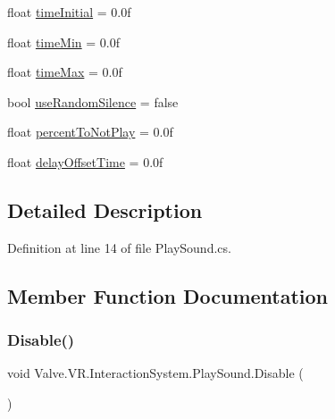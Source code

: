 \begin{DoxyCompactItemize}
\item 
float \mbox{\hyperlink{class_valve_1_1_v_r_1_1_interaction_system_1_1_play_sound_af2f0628f54b79371c313f5622319352c}{time\+Initial}} = 0.\+0f
\item 
float \mbox{\hyperlink{class_valve_1_1_v_r_1_1_interaction_system_1_1_play_sound_a9af0b793075326bc08f5611102804653}{time\+Min}} = 0.\+0f
\item 
float \mbox{\hyperlink{class_valve_1_1_v_r_1_1_interaction_system_1_1_play_sound_ae46e5c46bdfd5b13c0f3c49715cc2e67}{time\+Max}} = 0.\+0f
\item 
bool \mbox{\hyperlink{class_valve_1_1_v_r_1_1_interaction_system_1_1_play_sound_a306eb804f2d5a9ef421cce46e8983241}{use\+Random\+Silence}} = false
\item 
float \mbox{\hyperlink{class_valve_1_1_v_r_1_1_interaction_system_1_1_play_sound_a2e25c4114c27b32c29b43e97e9f03d0a}{percent\+To\+Not\+Play}} = 0.\+0f
\item 
float \mbox{\hyperlink{class_valve_1_1_v_r_1_1_interaction_system_1_1_play_sound_ad26bd2df1c10742c010f34bf2ea9e1a3}{delay\+Offset\+Time}} = 0.\+0f
\end{DoxyCompactItemize}


\subsection{Detailed Description}


Definition at line 14 of file Play\+Sound.\+cs.



\subsection{Member Function Documentation}
\mbox{\label{class_valve_1_1_v_r_1_1_interaction_system_1_1_play_sound_ad0590ec5a8c346142b7ada429f08e590}} 
\subsubsection{\texorpdfstring{Disable()}{Disable()}}
{\footnotesize\ttfamily void Valve.\+V\+R.\+Interaction\+System.\+Play\+Sound.\+Disable (\begin{DoxyParamCaption}{ }\end{DoxyParamCaption})}



